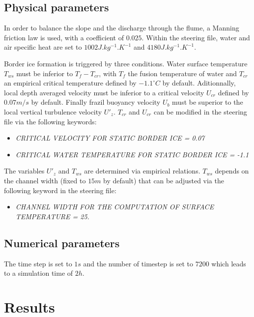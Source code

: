 \subsection{Physical parameters}

In order to balance the slope and the discharge through the flume, a Manning friction law is used, with a coefficient of $0.025$. Within the \waqtel steering file, water and air specific heat are set to $1002J.kg^{-1}.K^{-1}$ and $4180 J.kg^{-1}.K^{-1}$.

Border ice formation is triggered by three conditions. Water surface temperature $T_{ws}$ must be inferior to  $T_f-T_{cr}$, with $T_f$ the fusion temperature of water and $T_{cr}$ an empirical critical temperature defined by $-1.1^{\circ} C$ by default. Aditionnally, local depth averaged velocity must be inferior to a critical velocity $U_{cr}$ defined by $0.07 m/s$ by default. Finally frazil buoyancy velocity $U_b$ must be superior to the local vertical turbulence velocity $U'_z$. $T_{cr}$ and $U_{cr}$ can be modified in the \khione steering file via the following keywords:
\begin{itemize}
	\item\textit{CRITICAL VELOCITY FOR STATIC BORDER ICE = 0.07}
	\item\textit{CRITICAL WATER TEMPERATURE FOR STATIC BORDER ICE = -1.1}
\end{itemize}
The variables $U'_z$ and $T_{ws}$ are determined via empirical relations. $T_{ws}$ depends on the channel width (fixed to $15m$ by default) that can be adjusted via the following keyword in the \khione steering file:
\begin{itemize}
	\item\textit{CHANNEL WIDTH FOR THE COMPUTATION OF SURFACE TEMPERATURE = 25.}
\end{itemize}

\subsection{Numerical parameters}
The time step is set to $1s$ and the number of timestep is set to $7200$ which leads to a simulation time of $2h$.

\section{Results}

